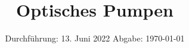

\subject{V21}
\title{Optisches Pumpen}
\date{%
  Durchführung: 13. Juni 2022
  \hspace{3em}
  Abgabe: \today
}



\maketitle
\thispagestyle{empty}
\tableofcontents
\newpage

%






\printbibliography{}



